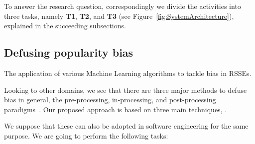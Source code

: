 To answer the research question, correspondingly we divide the activities into three tasks, namely \textbf{T1}, \textbf{T2}, and \textbf{T3} (see Figure~\ref{fig:SystemArchitecture}), %
explained in the succeeding subsections.




\subsection{Defusing popularity bias}


The application of various Machine Learning algorithms to tackle bias in RSSEs.

Looking to other domains, we see that there are three major methods to defuse bias in general, \ie the pre-processing, in-processing, and post-processing paradigms~\cite{doi:10.1089/big.2016.0048}. Our proposed approach is based on three main techniques, \ie .

We suppose that these can also be adopted in software engineering for the same purpose. %
We are going to perform the following tasks:

